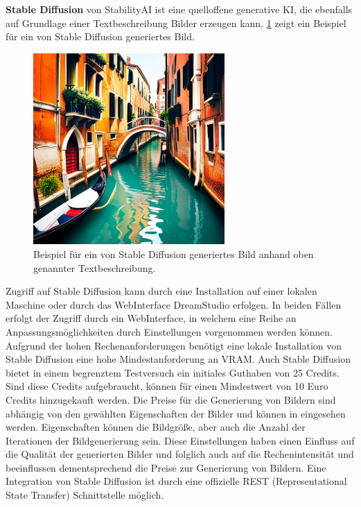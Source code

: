 \textbf{Stable Diffusion} von StabilityAI ist eine quelloffene generative KI, die ebenfalls auf Grundlage einer Textbeschreibung Bilder erzeugen kann.
\cref{sec2:sota:subsubsec:fz1:discussion:fig:venice-stable-diffusion} zeigt ein Beispiel für ein von Stable Diffusion generiertes Bild.
\begin{figure}[htb]
    \centering
    \includegraphics[width=0.65\textwidth, keepaspectratio]{chapter/chapter_2/venice-stable-diffusion.png}
    \caption{Beispiel für ein von Stable Diffusion generiertes Bild anhand oben genannter Textbeschreibung.}
    \label{sec2:sota:subsubsec:fz1:discussion:fig:venice-stable-diffusion}
\end{figure}
Zugriff auf Stable Diffusion kann durch eine Installation auf einer lokalen Maschine oder durch das WebInterface DreamStudio erfolgen.
In beiden Fällen erfolgt der Zugriff durch ein WebInterface, in welchem eine Reihe an Anpassungsmöglichkeiten durch Einstellungen vorgenommen werden können.
Aufgrund der hohen Rechenanforderungen benötigt eine lokale Installation von Stable Diffusion eine hohe Mindestanforderung an VRAM.
Auch Stable Diffusion bietet in einem begrenztem Testversuch ein initiales Guthaben von 25 Credits.
Sind diese Credits aufgebraucht, können für einen Mindestwert von 10 Euro Credits hinzugekauft werden.
Die Preise für die Generierung von Bildern sind abhängig von den gewählten Eigenschaften der Bilder und können in \cite{sd-pricing} eingesehen werden.
Eigenschaften können die Bildgröße, aber auch die Anzahl der Iterationen der Bildgenerierung sein.
Diese Einstellungen haben einen Einfluss auf die Qualität der generierten Bilder und folglich auch auf die Rechenintensität und beeinflussen dementsprechend die Preise zur Generierung von Bildern.
Eine Integration von Stable Diffusion ist durch eine offizielle REST (Representational State Transfer) \cite{rest} Schnittstelle möglich.
    
